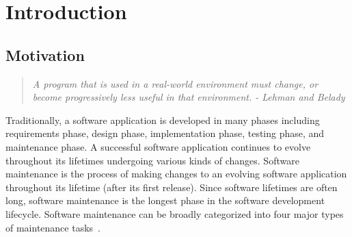 \chapter{Introduction}
\label{sec:intro}




\section{Motivation}
\label{sec:motivation}
\begin{quotation}
\em A program that is used in a real-world environment must change, or become progressively less useful in that environment.  - Lehman and Belady~\cite{lehman:1985}
\end{quotation}



Traditionally, a software application is developed in many phases including requirements phase, design phase, implementation phase, testing phase, and maintenance  phase. A successful software application continues to evolve throughout its lifetimes undergoing various kinds of changes. Software maintenance is the process of making changes to an evolving software application throughout its lifetime (after its first release). Since software lifetimes are often long, software maintenance is the longest phase in the software development lifecycle. Software maintenance can be broadly categorized into four major types of maintenance tasks~\cite{lientz80}.  

